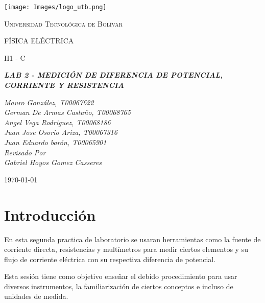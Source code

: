 \documentclass[letterpaper, 12pt]{report}
\begin{document}
\begin{titlepage}
	\centering
	\texttt{[image: Images/logo\_utb.png]}\par\vspace{1cm}
	{\scshape\LARGE Universidad Tecnológica de Bolívar \par}
	\vspace{1cm}

	{\scshape\Large FÍSICA ELÉCTRICA \par}
	\vspace{.2cm}

	{\scshape\Large H1 - C \par}
	\vspace{1cm}
	\slshape {\Large \bfseries{} LAB 2 - MEDICIÓN DE DIFERENCIA DE POTENCIAL, CORRIENTE Y RESISTENCIA \\}
	\vspace{1cm}

	\slshape {\itshape{} Mauro González, T00067622 \\}
	\slshape {\itshape{} German De Armas Castaño, T00068765 \\}
	\slshape {\itshape{} Angel Vega Rodriguez, T00068186 \\}
	\slshape {\itshape{} Juan Jose Osorio Ariza, T00067316 \\}
	\slshape {\itshape{} Juan Eduardo barón, T00065901 \\}
	\vfill
	Revisado Por \\
	Gabriel Hoyos Gomez Casseres\\
	{\large \today\par}
\end{titlepage}

\section{Introducción}

En esta segunda practica de laboratorio se usaran herramientas como la 
fuente de corriente directa, resistencias y multímetros para medir ciertos 
elementos y su flujo de corriente eléctrica con su respectiva diferencia 
de potencial. 

\vspace{.5cm}

Esta sesión tiene como objetivo enseñar el debido procedimiento
para usar diversos instrumentos, la familiarización de ciertos conceptos 
e incluso de unidades de medida.
\end{document}
